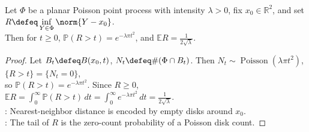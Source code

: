 \begin{proposition} \label{prop:planar-poisson-nearest-neighbor} \\
Let $\Phi$ be a planar Poisson point process with intensity $\lambda>0$, fix $x_0\in\mathbb{R}^2$, and set $R\defeq\inf\limits_{Y\in\Phi}\norm{Y-x_0}$.\\
Then for $t\geq0$, $\mathbb{P}(R>t)=e^{-\lambda\pi t^2}$, and $\mathbb{E}R=\frac{1}{2\sqrt{\lambda}}$.
\begin{proof} Let $B_t\defeq B(x_0,t)$, $N_t\defeq\#(\Phi\cap B_t)$. Then $N_t\sim\operatorname{Poisson}(\lambda\pi t^2)$, $\{R>t\}=\{N_t=0\}$,\\
so $\mathbb{P}(R>t)=e^{-\lambda\pi t^2}$. Since $R\geq0$, $\mathbb{E}R=\int_0^\infty\mathbb{P}(R>t)\,dt=\int_0^\infty e^{-\lambda\pi t^2}\,dt=\frac{1}{2\sqrt{\lambda}}$.\\
: Nearest-neighbor distance is encoded by empty disks around $x_0$.\\
: The tail of $R$ is the zero-count probability of a Poisson disk count.
\end{proof}
\end{proposition}

